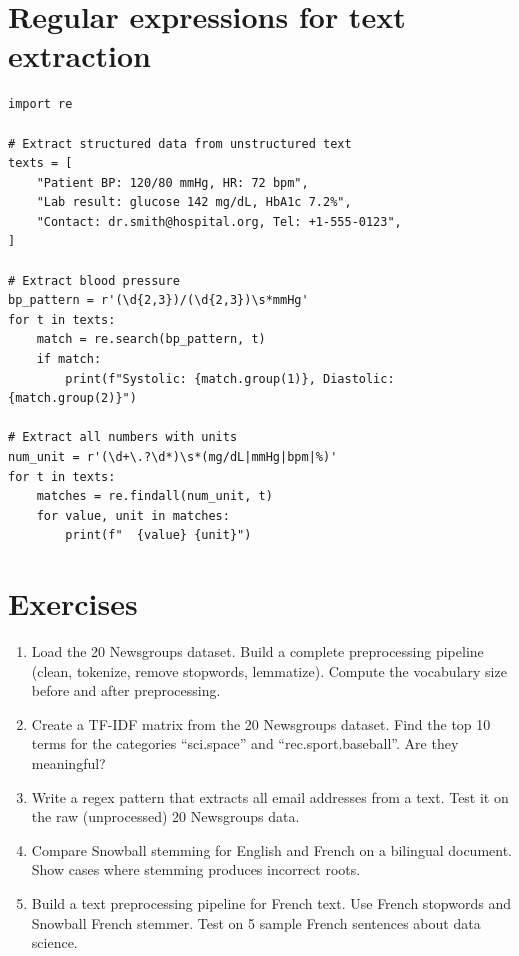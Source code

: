 \section{Regular expressions for text extraction}

\begin{verbatim}
import re

# Extract structured data from unstructured text
texts = [
    "Patient BP: 120/80 mmHg, HR: 72 bpm",
    "Lab result: glucose 142 mg/dL, HbA1c 7.2%",
    "Contact: dr.smith@hospital.org, Tel: +1-555-0123",
]

# Extract blood pressure
bp_pattern = r'(\d{2,3})/(\d{2,3})\s*mmHg'
for t in texts:
    match = re.search(bp_pattern, t)
    if match:
        print(f"Systolic: {match.group(1)}, Diastolic: {match.group(2)}")

# Extract all numbers with units
num_unit = r'(\d+\.?\d*)\s*(mg/dL|mmHg|bpm|%)'
for t in texts:
    matches = re.findall(num_unit, t)
    for value, unit in matches:
        print(f"  {value} {unit}")
\end{verbatim}

\section{Exercises}

\begin{exercise}
\begin{enumerate}
  \item Load the 20 Newsgroups dataset. Build a complete preprocessing pipeline (clean, tokenize, remove stopwords, lemmatize). Compute the vocabulary size before and after preprocessing.
  \item Create a TF-IDF matrix from the 20 Newsgroups dataset. Find the top 10 terms for the categories ``sci.space'' and ``rec.sport.baseball''. Are they meaningful?
  \item Write a regex pattern that extracts all email addresses from a text. Test it on the raw (unprocessed) 20 Newsgroups data.
  \item Compare Snowball stemming for English and French on a bilingual document. Show cases where stemming produces incorrect roots.
  \item Build a text preprocessing pipeline for French text. Use French stopwords and Snowball French stemmer. Test on 5 sample French sentences about data science.
\end{enumerate}
\end{exercise}

